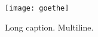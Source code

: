 \begin{figure}[hb]
	\centering
	\texttt{[image: goethe]}
	\caption[Short caption]{
		Long caption.
		Multiline.
	}\label{figure:goethe}
\end{figure}
